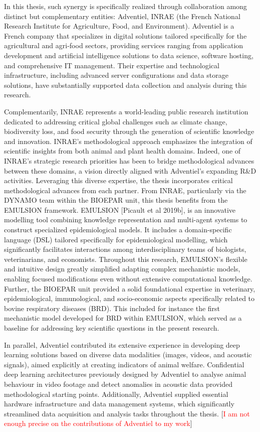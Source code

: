 In this thesis, such synergy is specifically realized through collaboration among distinct but complementary entities: Adventiel, INRAE (the French National Research Institute for Agriculture, Food, and Environment). Adventiel is a French company that specializes in digital solutions tailored specifically for the agricultural and agri-food sectors, providing services ranging from application development and artificial intelligence solutions to data science, software hosting, and comprehensive IT management. Their expertise and technological infrastructure, including advanced server configurations and data storage solutions, have substantially supported data collection and analysis during this research.

Complementarily, INRAE represents a world-leading public research institution dedicated to addressing critical global challenges such as climate change, biodiversity loss, and food security through the generation of scientific knowledge and innovation. INRAE's methodological approach emphasizes the integration of scientific insights from both animal and plant health domains. Indeed, one of INRAE's strategic research priorities has been to bridge methodological advances between these domains, a vision directly aligned with Adventiel's expanding R\&D activities. Leveraging this diverse expertise, the thesis incorporates critical methodological advances from each partner. From INRAE, particularly via the DYNAMO team within the BIOEPAR unit, this thesis benefits from the EMULSION framework. EMULSION [Picault et al 2019b], is an innovative modelling tool combining knowledge representation and multi-agent systems to construct specialized epidemiological models. It includes a domain-specific language (DSL) tailored specifically for epidemiological modelling, which significantly facilitates interactions among interdisciplinary teams of biologists, veterinarians, and economists. Throughout this research, EMULSION's flexible and intuitive design greatly simplified adapting complex mechanistic models, enabling focused modifications even without extensive computational knowledge. Further, the BIOEPAR unit provided a solid foundational expertise in veterinary, epidemiological, immunological, and socio-economic aspects specifically related to bovine respiratory diseases (BRD). This included for instance the first mechanistic model developed for BRD within EMULSION, which served as a baseline for addressing key scientific questions in the present research.

In parallel, Adventiel contributed its extensive experience in developing deep learning solutions based on diverse data modalities (images, videos, and acoustic signals), aimed explicitly at creating indicators of animal welfare. Confidential deep learning architectures previously designed by Adventiel to analyse animal behaviour in video footage and detect anomalies in acoustic data provided methodological starting points. Additionally, Adventiel supplied essential hardware infrastructure and data management systems, which significantly streamlined data acquisition and analysis tasks throughout the thesis. [\textcolor{red}{I am not enough precise on the contributions of Adventiel to my work}]

